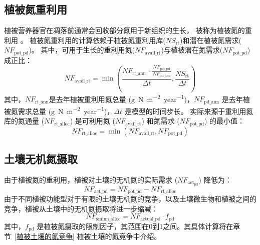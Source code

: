 \subsection{植被氮重利用}\label{植被氮重利用}
植被营养器官在凋落前通常会回收部分氮用于新组织的生长，
被称为植被氮的重利用 \citep{magill1997biogeochemical,oikawa2005dynamics,son1991aboveground}。
植被氮重利用的计算依赖于植被氮重利用库($NS_{\mathrm{rt}}$)和潜在植被氮需求($NF_{\mathrm{pot\_{pd}}}$)。
其中，可用于生长的重利用氮($NF_{\mathrm{avail\_{rt}}}$)与植被潜在氮需求($NF_{\mathrm{pot\_{pd}}}$)成正比：
\begin{equation}
  NF_{\mathrm{avail\_rt}}=\min{\left(\frac{NF_{\mathrm{rt\_ann}}\ \cdot \frac{NF_{\mathrm{pot\_{pd}}}}{NF_{\mathrm{pd\_{ann}}}}}{{\Delta t}}, \frac{NS_{\mathrm{rt}}}{{\Delta t}}\right)}
\end{equation}
其中，$NF_{\mathrm{rt\_ann}}$是去年植被重利用氮总量 (\unit{g.N.m^{-2}.year^{-1}})，$NF_{\mathrm{pd\_{ann}}}$ 是去年植被氮需求总量 (\unit{g.N.m^{-2}.year^{-1}})，${\Delta t}$ 是模型的时间步长。
实际来源于重利用氮库的氮通量 ($NF_{\mathrm{rt\_alloc}}$) 是可利用氮 ($NF_{\mathrm{avail\_rt}}$) 和氮需求 ($NF_{\mathrm{pot\_{pd}}}$) 的最小值：
\begin{equation}\label{NF_rt_alloc}
  NF_{\mathrm{rt\_alloc}}=\min{\left(NF_{\mathrm{avail\_{rt}}}, NF_{\mathrm{pot\_{pd}}}\right)}
\end{equation}


\subsection{土壤无机氮摄取}\label{土壤无机氮摄取}
由于植被氮的重利用，植被对土壤的无机氮的实际需求 ($NF_{\mathrm{act_{pd}}}$) 降低为：
\begin{equation}\label{NF_plant_demand_soil}
  NF_{\mathrm{act\_{pd}}} = NF_{\mathrm{pot\_{pd}}} - NF_{\mathrm{rt\_alloc}}
\end{equation}
由于不同植被功能型对于有限的土壤无机氮的竞争，以及土壤微生物和植被之间的竞争，植被从土壤中的无机氮摄取将进一步缩减：
\begin{equation}\label{NF_sminn_alloc}
  NF_{\mathrm{sminn\_alloc}} = NF_{\mathrm{actual\_{pd}}}\cdot f_{\mathrm{pd}}
\end{equation}
其中，$f_{\mathrm{pd}}$ 是植被氮摄取的限制因子，其范围在0到1之间。其具体计算将在章节~\ref{植被土壤的氮竞争} 植被土壤的氮竞争中介绍。


